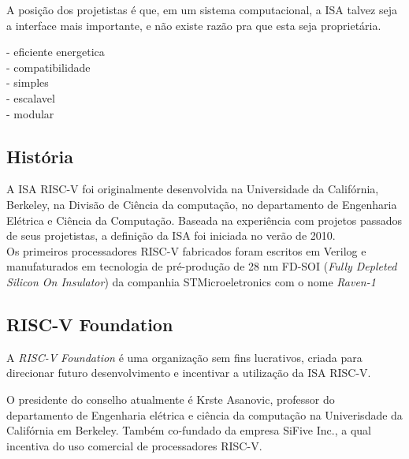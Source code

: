 		A posição dos projetistas é que, em um sistema computacional, a ISA talvez seja a interface mais importante, e não existe razão pra que esta seja proprietária.

		

			- eficiente energetica\\
			- compatibilidade\\
			- simples\\
			- escalavel\\
			- modular\\




	\subsection{História}%
		A ISA RISC-V foi originalmente desenvolvida na Universidade da Califórnia, Berkeley, na Divisão de Ciência da computação, no departamento de Engenharia Elétrica e Ciência da Computação. Baseada na experiência com projetos passados de seus projetistas, a definição da ISA foi iniciada no verão de 2010.\\

		Os primeiros processadores RISC-V fabricados foram escritos em Verilog e manufaturados em tecnologia de pré-produção de 28 nm FD-SOI (\textit{Fully Depleted Silicon On Insulator}) da companhia STMicroeletronics com o nome \textit{Raven-1}


	

	\subsection{RISC-V Foundation}
		
		A \textit{RISC-V Foundation} é uma organização sem fins lucrativos, criada para direcionar futuro desenvolvimento e incentivar a utilização da ISA RISC-V.\ ~\cite{riscv_foundation} 

		O presidente do conselho atualmente é Krste Asanovic, professor do departamento de Engenharia elétrica e ciência da computação na Univerisdade da Califórnia em Berkeley. Também co-fundado da empresa SiFive Inc., a qual incentiva do uso comercial de processadores RISC-V.\

